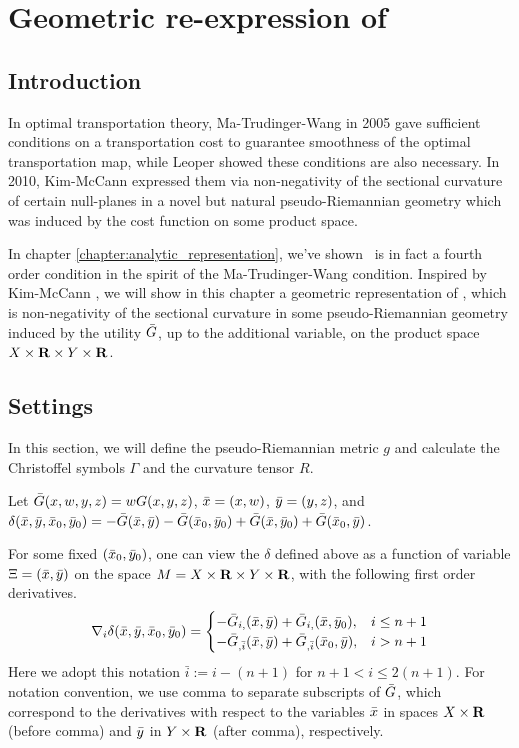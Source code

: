 \chapter{Geometric re-expression of \Gthree}\label{chapter:geometry}

\section{Introduction}

In optimal transportation theory, Ma-Trudinger-Wang \cite{MaTrudingerWang05} in 2005 gave sufficient conditions on a transportation cost to guarantee smoothness of the optimal transportation map, while Leoper \cite{Loeper09} showed these conditions are also necessary. In 2010, Kim-McCann \cite{KimMcCann10} expressed them via non-negativity of the sectional curvature of certain null-planes in a novel but natural pseudo-Riemannian geometry which was induced by the cost function on some product space.\medskip

In chapter \ref{chapter:analytic_representation}, we've shown \Gthree~is in fact a fourth order condition in the spirit of the Ma-Trudinger-Wang condition. Inspired by Kim-McCann \cite{KimMcCann10}, we will show in this chapter a geometric representation of \Gthree, which is non-negativity of the sectional curvature in some pseudo-Riemannian geometry induced by the utility $\bar{G}$, up to the additional variable, on the product space $X\times {\mathbf R} \times Y \times {\mathbf R}$.\medskip

\section{Settings}\label{section:geometric_setting}

In this section, we will define the pseudo-Riemannian metric $g$ and calculate the Christoffel symbols $\Gamma$ and the curvature tensor $R$. \medskip

Let $\bar{G} (x,w, y,z) = w G(x,y,z)$, $\bar{x} = (x,w)$, $\bar{y} = (y,z)$, and $\delta(\bar{x}, \bar{y}, \bar{x}_{0}, \bar{y}_{0}) = -\bar{G} (\bar{x}, \bar{y}) -\bar{G}(\bar{x}_0, \bar{y}_0) +\bar{G}(\bar{x}, \bar{y}_0) + \bar{G}(\bar{x}_0, \bar{y})$.\medskip

For some fixed $(\bar{x}_0, \bar{y}_0)$, one can view the $\delta$ defined above as a function of variable $\Xi =(\bar{x}, \bar{y})$ on the space $M = X \times {\mathbf R} \times Y \times {\mathbf R}$, with the following first order derivatives.
\begin{equation}
	\nabla_i \delta (\bar{x}, \bar{y}, \bar{x}_0, \bar{y}_0) = \begin{cases}
	-\bar{G}_{i,}(\bar{x}, \bar{y}) + \bar{G}_{i,}(\bar{x}, \bar{y}_0) , & i\le n+1\\
	-\bar{G}_{,\bar{i}}(\bar{x}, \bar{y}) + \bar{G}_{,\bar{i}}(\bar{x}_0, \bar{y}), & i> n+1 \\
	\end{cases}
\end{equation}
Here we adopt this notation $\bar{i}:= i-(n+1)$ for $n+1 <i\le 2(n+1)$. For notation convention, we use comma to separate subscripts of $\bar{G}$, which correspond to the derivatives with respect to the variables $\bar{x}$ in spaces $X \times {\mathbf R}$ (before comma) and $\bar{y}$ in $Y \times {\mathbf R}$ (after comma), respectively.\medskip

